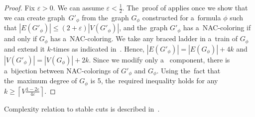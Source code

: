 \begin{proof}
	Fix $\varepsilon>0$. We can assume $\varepsilon<\frac{1}{2}$.
	The~proof of  applies once we show that
	we can create graph~$G'_\phi$ from the~graph $G_\phi$ constructed for a~formula $\phi$
	such that $|E(G'_\phi)| \leq (2 + \varepsilon) |V(G'_\phi)|$, and
	the~graph $G'_\phi$ has a~NAC-coloring if and only if $G_\phi$ has a~NAC-coloring.
	We take any braced ladder in a~train of $G_\phi$
	and extend it $k$-times as indicated in~.
	Hence, $|E(G'_\phi)| = |E(G_\phi)|+4k$ and $|V(G'_\phi)| = |V(G_\phi)|+2k$.
	Since we modify only a~\trcon{} component,
	there is a~bijection between NAC-colorings of $G'_\phi$ and $G_\phi$.
	Using the~fact that the~maximum degree of $G_\phi$ is 5,
	the~required inequality holds for any  $k\geq\left\lceil V\frac{1-2\varepsilon}{4\varepsilon}\right\rceil$.
\end{proof}

Complexity relation to stable cuts is described in~.

